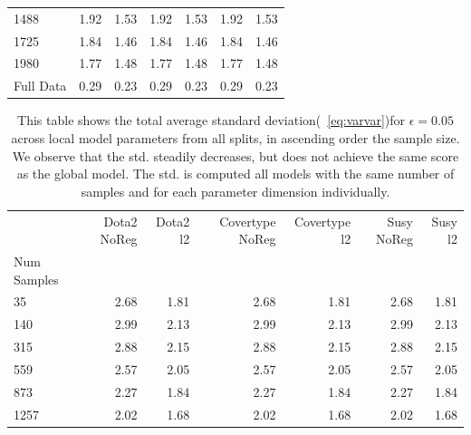 \begin{table}[!htb]
\begin{tabular}{l||rr|rr|rr}
    1488        &         1.92 &      1.53 &             1.92 &          1.53 &        1.92 &     1.53 \\
    1725        &         1.84 &      1.46 &             1.84 &          1.46 &        1.84 &     1.46 \\
    1980        &         1.77 &      1.48 &             1.77 &          1.48 &        1.77 &     1.48 \\
    Full Data       &         0.29 &      0.23 &             0.29 &          0.23 &        0.29 &     0.23 \\
    \bottomrule
    \end{tabular}
    \end{table}

    \begin{table}[!htb]
        \centering
        \caption[]{This table shows the total average standard deviation(\eq~\ref{eq:varvar})for $\epsilon=0.05$ across local model parameters from all splits, in ascending order \wrt the sample size. We observe that the std. steadily decreases, but does not achieve the same score as the global model. The std. is computed \wrt all models with the same number of samples and for each parameter dimension individually.
        }
        \label{tab_avg_std_005}
        \begin{tabular}{l||rr|rr|rr}
        \toprule
        {} &  Dota2 NoReg &  Dota2 l2 &  Covertype NoReg &  Covertype l2 &  Susy NoReg &  Susy l2 \\
        Num Samples &              &           &                  &               &             &          \\
        \midrule
        35          &         2.68 &      1.81 &             2.68 &          1.81 &        2.68 &     1.81 \\
        140         &         2.99 &      2.13 &             2.99 &          2.13 &        2.99 &     2.13 \\
        315         &         2.88 &      2.15 &             2.88 &          2.15 &        2.88 &     2.15 \\
        559         &         2.57 &      2.05 &             2.57 &          2.05 &        2.57 &     2.05 \\
        873         &         2.27 &      1.84 &             2.27 &          1.84 &        2.27 &     1.84 \\
        1257        &         2.02 &      1.68 &             2.02 &          1.68 &        2.02 &     1.68 \\

\end{tabular}
\end{table}
